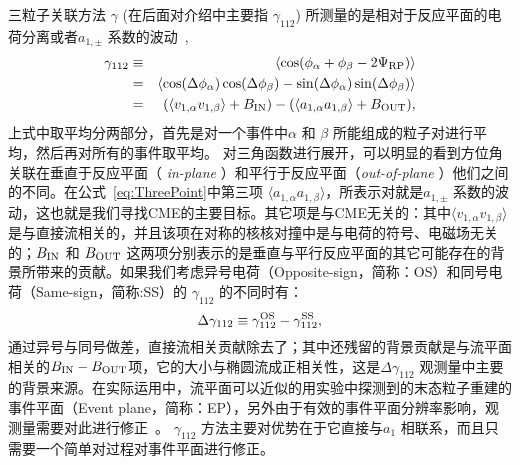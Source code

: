 三粒子关联方法 $\gamma$ (在后面对介绍中主要指 $\gamma_{112}$) 所测量的是相对于反应平面的电荷分离或者$a_{1,\pm}$ 系数的波动~\cite{Voloshin:2008dg},
\begin{eqnarray}
\gamma_{112} &\equiv&  \langle \cos(\phi_\alpha + \phi_\beta -2{\rm \Psi_{RP}}) \rangle \nonumber \\
&=& \langle\cos(\Delta\phi_{\alpha})\cos(\Delta\phi_{\beta}) -
\sin(\Delta\phi_{\alpha})\sin(\Delta\phi_{\beta})\rangle \nonumber \\
&=& (\langle v_{1,\alpha}v_{1,\beta}\rangle + B_{\rm IN}) -(\langle a_{1,\alpha}a_{1,\beta}\rangle + B_{\rm OUT}), \label{eq:ThreePoint}
\end{eqnarray}
\noindent 上式中取平均分两部分，首先是对一个事件中$\alpha$ 和 $\beta$ 所能组成的粒子对进行平均，然后再对所有的事件取平均。
对三角函数进行展开，可以明显的看到方位角关联在垂直于反应平面（ {\it in-plane} ）和平行于反应平面（{\it out-of-plane} ）他们之间的不同。在公式~\ref{eq:ThreePoint}中第三项 $\langle a_{1,\alpha}a_{1,\beta}\rangle$，所表示对就是$a_{1,\pm}$ 系数的波动，这也就是我们寻找CME的主要目标。其它项是与CME无关的：其中$\langle v_{1,\alpha}v_{1,\beta}\rangle$ 是与直接流相关的，并且该项在对称的核核对撞中是与电荷的符号、电磁场无关的；$B_{\rm IN}$ 和 $B_{\rm OUT}$ 这两项分别表示的是垂直与平行反应平面的其它可能存在的背景所带来的贡献。如果我们考虑异号电荷（Opposite-sign，简称：OS）和同号电荷（Same-sign，简称:SS）的 $\gamma_{112}$ 的不同时有：
\begin{equation}
\Delta \gamma_{112} \equiv \gamma^{\rm OS}_{112} - \gamma^{\rm SS}_{112}, 
\end{equation}
\noindent 通过异号与同号做差，直接流相关贡献除去了；其中还残留的背景贡献是与流平面相关的$B_{\rm IN}-B_{\rm OUT}$项，它的大小与椭圆流成正相关性，这是$\Delta \gamma_{112}$ 观测量中主要的背景来源。在实际运用中，流平面可以近似的用实验中探测到的末态粒子重建的事件平面（Event plane，简称：EP），另外由于有效的事件平面分辨率影响，观测量需要对此进行修正~\cite{Poskanzer:1998yz}。
$\gamma_{112}$ 方法主要对优势在于它直接与$a_1$ 相联系，而且只需要一个简单对过程对事件平面进行修正。

